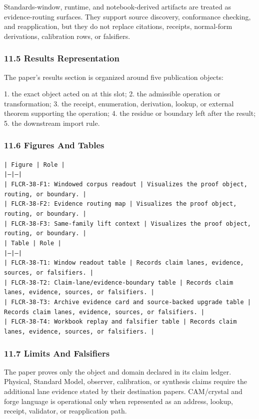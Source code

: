 \documentclass[11pt]{article}
\begin{document}
Standards-window, runtime, and notebook-derived artifacts are treated
as evidence-routing surfaces. They support source discovery, conformance
checking, and reapplication, but they do not replace citations, receipts,
normal-form derivations, calibration rows, or falsifiers.

\subsubsection*{11.5 Results Representation}

The paper's results section is organized around five publication objects:

1. the exact object acted on at this slot;
2. the admissible operation or transformation;
3. the receipt, enumeration, derivation, lookup, or external theorem supporting
   the operation;
4. the residue or boundary left after the result;
5. the downstream import rule.

\subsubsection*{11.6 Figures And Tables}

\noindent\texttt{| Figure | Role |}\\
\noindent\texttt{|---|---|}\\
\noindent\texttt{| FLCR-38-F1: Windowed corpus readout | Visualizes the proof object, routing, or boundary. |}\\
\noindent\texttt{| FLCR-38-F2: Evidence routing map | Visualizes the proof object, routing, or boundary. |}\\
\noindent\texttt{| FLCR-38-F3: Same-family lift context | Visualizes the proof object, routing, or boundary. |}\\

\noindent\texttt{| Table | Role |}\\
\noindent\texttt{|---|---|}\\
\noindent\texttt{| FLCR-38-T1: Window readout table | Records claim lanes, evidence, sources, or falsifiers. |}\\
\noindent\texttt{| FLCR-38-T2: Claim-lane/evidence-boundary table | Records claim lanes, evidence, sources, or falsifiers. |}\\
\noindent\texttt{| FLCR-38-T3: Archive evidence card and source-backed upgrade table | Records claim lanes, evidence, sources, or falsifiers. |}\\
\noindent\texttt{| FLCR-38-T4: Workbook replay and falsifier table | Records claim lanes, evidence, sources, or falsifiers. |}\\

\subsubsection*{11.7 Limits And Falsifiers}

The paper proves only the object and domain declared in its claim ledger.
Physical, Standard Model, observer, calibration, or synthesis claims require
the additional lane evidence stated by their destination papers. CAM/crystal
and forge language is operational only when represented as an address, lookup,
receipt, validator, or reapplication path.
\end{document}
